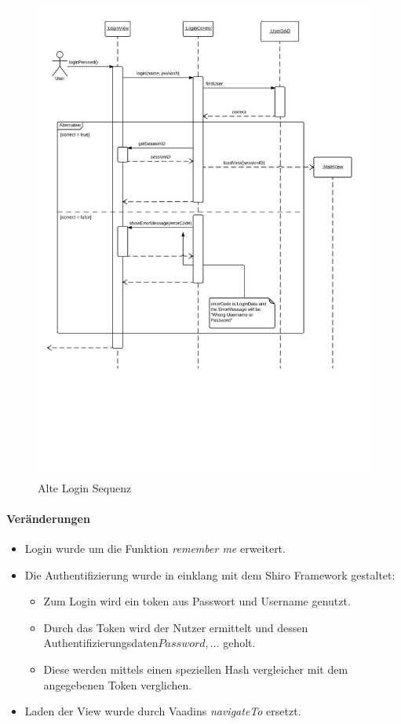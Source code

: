 \begin{figure}[H]
      \centering
        \includegraphics[scale=0.1]{Login-Sequenz.pdf}
       \caption{Alte Login Sequenz}
    \end{figure}

    \paragraph{Veränderungen}
        \begin{itemize}
            \item Login wurde um die Funktion \emph{remember me} erweitert.
            \item Die Authentifizierung wurde in einklang mit dem Shiro Framework gestaltet:
            \begin{itemize}
                \item Zum Login wird ein token aus Passwort und Username genutzt.
                \item Durch das Token wird der Nutzer ermittelt und dessen Authentifizierungsdaten\(Password, ...\) geholt.
                \item Diese werden mittels einen speziellen Hash vergleicher mit dem angegebenen Token verglichen.
            \end{itemize}
            \item Laden der View wurde durch Vaadins \emph{navigateTo} ersetzt.
        \end{itemize}

